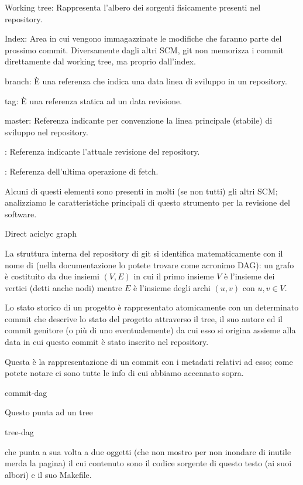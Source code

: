 \elemento Working tree: Rappresenta l'albero dei sorgenti fisicamente presenti
nel repository.

\elemento Index: Area in cui vengono immagazzinate le modifiche che faranno
parte del prossimo commit. Diversamente dagli altri SCM, git non memorizza i
commit direttamente dal working tree, ma proprio dall'index.

\elemento branch: \`E una referenza che indica una data linea di sviluppo in un
repository.

\elemento tag: \`E una referenza statica ad un data revisione.

\elemento master: Referenza indicante per convenzione la linea principale
(stabile) di sviluppo nel repository.

\elemento {}: Referenza indicante l'attuale revisione del repository. 

\elemento {}: Referenza dell'ultima operazione di fetch. 
\medskip

Alcuni di questi elementi sono presenti in molti (se non tutti) gli altri SCM;
analizziamo le caratteristiche principali di questo strumento per la revisione
del software.

\sezione Direct aciclyc graph

La struttura interna del repository di git si identifica matematicamente con il
nome di  (nella documentazione lo potete
trovare come acronimo DAG): un grafo \`e costituito da due insiemi $(V,E)$ in
cui il primo insieme $V$ \`e l'insieme dei vertici (detti anche nodi) mentre
$E$ \`e l'insieme degli archi $(u,v)$ con $u,v\in V$.

Lo stato storico di un progetto \`e
rappresentato atomicamente con un determinato commit che descrive lo stato del
progetto attraverso il tree, il suo autore ed il commit genitore (o pi\`u di uno
eventualemente) da cui esso si origina assieme alla data in cui questo commit
\`e stato inserito nel repository.

Questa \`e la rappresentazione di un commit con i metadati relativi ad esso;
come potete notare ci sono tutte le info di cui abbiamo accennato sopra.

 commit-dag

Questo punta ad un tree

 tree-dag

che punta a sua volta a due oggetti (che non mostro per non inondare di inutile
merda la pagina) il cui contenuto sono il codice sorgente di questo testo (ai
suoi albori) e il suo Makefile.

